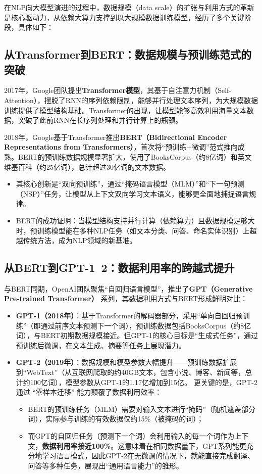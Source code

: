 在NLP向大模型演进的过程中，数据规模（data scale）的扩张与利用方式的革新是核心驱动力，从依赖大算力支撑到以大规模数据训练模型，经历了多个关键阶段，具体如下：

\subsection{从Transformer到BERT：数据规模与预训练范式的突破}

2017年，Google团队提出\textbf{Transformer模型}，其基于自注意力机制（Self-Attention），摆脱了RNN的序列依赖限制，能够并行处理文本序列，为大规模数据训练提供了模型结构基础。Transformer的出现，让模型能够高效利用海量文本数据，突破了此前RNN在长序列处理和并行计算上的瓶颈。

2018年，Google基于Transformer推出\textbf{BERT（Bidirectional Encoder Representations from Transformers）}，首次将“预训练+微调”范式推向成熟。BERT的预训练数据规模显著扩大，使用了BooksCorpus（约8亿词）和英文维基百科（约25亿词），总计超过30亿词的文本数据。  
\begin{itemize}
	\item 其核心创新是“双向预训练”，通过“掩码语言模型（MLM）”和“下一句预测（NSP）”任务，让模型从上下文双向学习文本语义，能够更全面地捕捉语言规律。  
	\item BERT的成功证明：当模型结构支持并行计算（依赖算力）且数据规模足够大时，预训练模型能在多种NLP任务（如文本分类、问答、命名实体识别）上超越传统方法，成为NLP领域的新基准。
\end{itemize}


\subsection{从BERT到GPT-1~2：数据利用率的跨越式提升}

与BERT同期，OpenAI团队聚焦“自回归语言模型”，推出了\textbf{GPT（Generative Pre-trained Transformer）} 系列，其数据利用方式与BERT形成鲜明对比：

\begin{itemize}
	\item \textbf{GPT-1（2018年）}：基于Transformer的解码器部分，采用“单向自回归预训练”（即通过前序文本预测下一个词），预训练数据包括BooksCorpus（约8亿词），与BERT初期数据规模接近。但GPT-1的核心目标是“生成式任务”，通过预训练后微调，在文本生成、摘要等任务上展现潜力。
	\item \textbf{GPT-2（2019年）}：数据规模和模型参数大幅提升——预训练数据扩展到“WebText”（从互联网爬取的约40GB文本，包含小说、博客、新闻等，总计约100亿词），模型参数从GPT-1的1.17亿增加到15亿。 更关键的是，GPT-2 通过 “零样本迁移” 能力颠覆了数据利用效率： 
        \begin{itemize}
            \item BERT的预训练任务（MLM）需要对输入文本进行“掩码”（随机遮盖部分词），实际参与训练的有效数据仅约15\%（被掩码的词）；  
            \item 而GPT的自回归任务（预测下一个词）会利用输入的每一个词作为上下文，\textbf{数据利用率接近100\%}。这意味着在相同数据量下，GPT系列能更充分地学习语言模式，因此GPT-2在无微调的情况下，就能直接完成翻译、问答等多种任务，展现出“通用语言能力”的雏形。
        \end{itemize}
\end{itemize}


